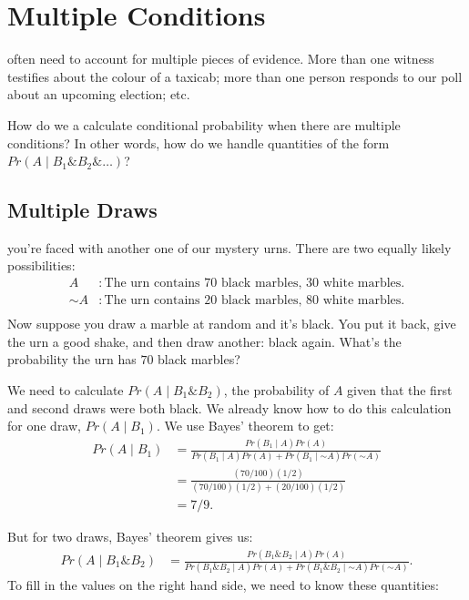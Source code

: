 \documentclass[justified]{tufte-book}
\newcommand{\given}{\mid}
\renewcommand{\neg}{\mathbin{\sim}}
\renewcommand{\wedge}{\mathbin{\&}}
\newcommand{\p}{Pr}
\theoremstyle{definition}
\theoremstyle{definition}
\theoremstyle{definition}
\theoremstyle{remark}
\begin{document}
\hypertarget{multiple-conditions}{%
\chapter{Multiple Conditions}\label{multiple-conditions}}

 often need to account for multiple pieces of evidence.
More than one witness testifies about the colour of a taxicab; more than
one person responds to our poll about an upcoming election; etc.

How do we a calculate conditional probability when there are multiple
conditions? In other words, how do we handle quantities of the form
\(\p(A \given B_1 \wedge B_2 \wedge \ldots)\)?

\hypertarget{multiple-draws}{%
\section{Multiple Draws}\label{multiple-draws}}

 you're faced with another one of our mystery urns.
There are two equally likely possibilities: \[
  \begin{aligned}
    A      &: \mbox{The urn contains $70$ black marbles, $30$ white marbles.}\\
    \neg A &: \mbox{The urn contains $20$ black marbles, $80$ white marbles.}\\
  \end{aligned}
\] Now suppose you draw a marble at random and it's black. You put it
back, give the urn a good shake, and then draw another: black again.
What's the probability the urn has \(70\) black marbles?

We need to calculate \(\p(A \given B_1 \wedge B_2)\), the probability of
\(A\) given that the first and second draws were both black. We already
know how to do this calculation for one draw, \(\p(A \given B_1)\). We
use Bayes' theorem to get: \[
  \begin{aligned}
    \p(A \given B_1) &= \frac{\p(B_1 \given A)\p(A)}{\p(B_1 \given A) \p(A) + \p(B_1 \given \neg A) \p(\neg A)} \\
      &= \frac{(70/100)(1/2)}{(70/100)(1/2) + (20/100)(1/2)}\\
      &= 7/9.
  \end{aligned}
\]

But for two draws, Bayes' theorem gives us: \[
  \begin{aligned}
    \p(A \given B_1 \wedge B_2) &= \frac{\p(B_1 \wedge B_2 \given A)\p(A)}{\p(B_1 \wedge B_2 \given A) \p(A) + \p(B_1 \wedge B_2 \given \neg A) \p(\neg A)}.
  \end{aligned}
\] To fill in the values on the right hand side, we need to know these
quantities:
\end{document}
